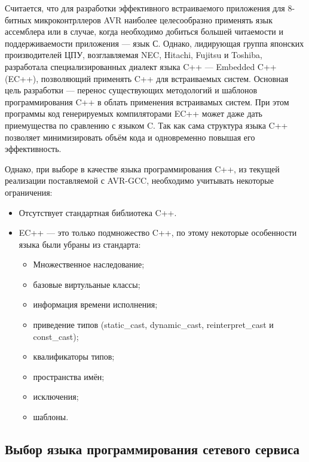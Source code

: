 \begin{par}
Считается\cite{avrev}, что для разработки эффективного встраиваемого приложения для 8-битных микроконтрллеров
AVR наиболее целесообразно применять язык ассемблера или в случае, когда необходимо добиться
большей читаемости и поддерживаемости приложения --- язык С.
Однако, лидирующая группа японских производителей ЦПУ, возглавляемая NEC, Hitachi, Fujitsu и Toshiba,
разработала специализированных диалект языка C++ --- Embedded C++ (EC++), позволяющий применять
C++ для встраиваемых систем. Основная цель разработки --- перенос существующих методологий и шаблонов
программирования C++ в облать применения встраивамых систем.
При этом программы код генерируемых компиляторами EC++ может даже дать приемущества по сравлению
с языком C. Так как сама структура языка C++ позволяет минимизировать объём кода и одновременно
повышая его эффективность.
\end{par}

\begin{par}
Однако, при выборе в качестве языка программирования C++, из текущей реализации поставляемой с AVR-GCC,
необходимо учитывать некоторые ограничения:
\begin{itemize}
    \item{} Отсутствует стандартная библиотека C++.
    \item{} EC++ --- это только подмножество C++, по этому некоторые особенности языка были
        убраны из стандарта:
        \begin{itemize}
            \item{} Множественное наследование;
            \item{} базовые виртульаные классы;
            \item{} информация времени исполнения;
            \item{} приведение типов (static\_cast, dynamic\_cast, reinterpret\_cast и const\_cast);
            \item{} квалификаторы типов;
            \item{} пространства имён;
            \item{} исключения;
            \item{} шаблоны.
        \end{itemize}
\end{itemize}
\end{par}



\subsection{Выбор языка программирования сетевого сервиса}


